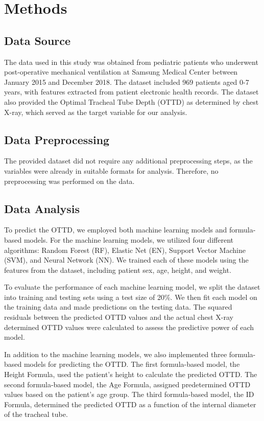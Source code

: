 \documentclass[11pt]{article}
\begin{document}
\section*{Methods}

\subsection*{Data Source}
The data used in this study was obtained from pediatric patients who underwent post-operative mechanical ventilation at Samsung Medical Center between January 2015 and December 2018. The dataset included 969 patients aged 0-7 years, with features extracted from patient electronic health records. The dataset also provided the Optimal Tracheal Tube Depth (OTTD) as determined by chest X-ray, which served as the target variable for our analysis.

\subsection*{Data Preprocessing}
The provided dataset did not require any additional preprocessing steps, as the variables were already in suitable formats for analysis. Therefore, no preprocessing was performed on the data.

\subsection*{Data Analysis}
To predict the OTTD, we employed both machine learning models and formula-based models. For the machine learning models, we utilized four different algorithms: Random Forest (RF), Elastic Net (EN), Support Vector Machine (SVM), and Neural Network (NN). We trained each of these models using the features from the dataset, including patient sex, age, height, and weight.

To evaluate the performance of each machine learning model, we split the dataset into training and testing sets using a test size of 20\%. We then fit each model on the training data and made predictions on the testing data. The squared residuals between the predicted OTTD values and the actual chest X-ray determined OTTD values were calculated to assess the predictive power of each model.

In addition to the machine learning models, we also implemented three formula-based models for predicting the OTTD. The first formula-based model, the Height Formula, used the patient's height to calculate the predicted OTTD. The second formula-based model, the Age Formula, assigned predetermined OTTD values based on the patient's age group. The third formula-based model, the ID Formula, determined the predicted OTTD as a function of the internal diameter of the tracheal tube.
\end{document}
